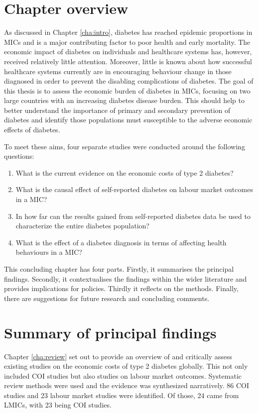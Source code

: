 \section{Chapter overview}
As discussed in Chapter \ref{cha:intro}, diabetes has reached epidemic proportions in \acp{MIC} and is a major contributing factor to poor health and early mortality. The economic impact of diabetes on individuals and healthcare systems has, however, received relatively little attention. Moreover, little is known about how successful healthcare systems currently are in encouraging behaviour change in those diagnosed in order to prevent the disabling complications of diabetes. The goal of this thesis is to assess the economic burden of diabetes in \acp{MIC}, focusing on two large countries with an increasing diabetes disease burden. This should help to better understand the importance of primary and secondary prevention of diabetes and identify those populations must susceptible to the adverse economic effects of diabetes.

To meet these aims, four separate studies were conducted around the following questions:
\begin{enumerate}
\item What is the current evidence on the economic costs of type 2 diabetes?
\item What is the causal effect of self-reported diabetes on labour market outcomes in a \ac{MIC}?
\item In how far can the results gained from self-reported diabetes data be used to characterize the entire diabetes population?
\item What is the effect of a diabetes diagnosis in terms of affecting health behaviours in a \ac{MIC}?
\end{enumerate}

This concluding chapter has four parts. Firstly, it summarises the principal findings. Secondly, it contextualises the findings within the wider literature and provides implications for policies. Thirdly it reflects on the methods. Finally, there are suggestions for future research and concluding comments.

\section{Summary of principal findings}

Chapter \ref{cha:review} set out to provide an overview of and critically assess existing studies on the economic costs of type 2 diabetes globally. This not only included \ac{COI} studies but also studies on labour market outcomes. Systematic review methods were used and the evidence was synthesized narratively. 86 \ac{COI} studies and 23 labour market studies were identified. Of those, 24 came from \acp{LMIC}, with 23 being \ac{COI} studies.

